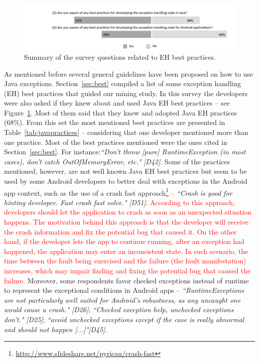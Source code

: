 \begin{figure} \centering \includegraphics[scale=0.60]{yes_no_best_new.png}
\caption{Summary of the survey questions related to EH best practices. }
\label{fig:allquest}
\end{figure}


As mentioned before several general guidelines have been proposed on how to
use Java exceptions. Section~\ref{sec:best}  compiled a list of some exception
handling (EH) best practices that guided our mining study. In this survey the
developers were also asked if they knew about and used Java EH best practices --
see Figure~\ref{fig:allquest}. Most of them said that they knew and adopted Java
EH practices (68\%). From this set the most mentioned best practices are
presented in Table~\ref{tab:javapractices} -- considering that one developer
mentioned more than one practice. Most of the best practices mentioned were the
ones cited in Section~\ref{sec:best}. For instance:\emph{``Don't throw [pure]
RuntimeException (in most cases), don't catch OutOfMemoryError, etc." [D42]}.
Some of the practices mentioned, however, are not well known Java EH best
practices but seem to be used by some Android developers to better deal with
exceptions in the Android app context, such as the use of a crash fast
approach\footnote{\url{http://www.slideshare.net/pyricau/crash-fast}} --
\emph{``Crash is good for hinting developer. Fast crash fast solve." [D51]}.
\textcolor{red}{According to this approach, developers should let the
application to crash as soon as an unexpected situation happens. The motivation
behind this approach is that the developer will receive the crash information
and fix the potential bug that caused it. On the other hand, if the developer
lets the app to continue running, after an exception had happened, the
application may enter an inconsistent state. In such scenario, the time between the fault being exercised and the failure (the fault manifestation) increases, which may impair finding and fixing the potential bug that caused the failure.} Moreover, some respondents favor checked exceptions instead of runtime to represent the exceptional conditions in Android apps -- \emph{``RuntimeExceptions are not particularly well suited for Android's robustness, as any uncaught one would cause a crash." [D26]}; \emph{``Checked exception help, unchecked exceptions don't." [D25]}; \emph{``avoid unchecked exceptions except if the case is really abnormal and should not happen [...]"[D45]}.

